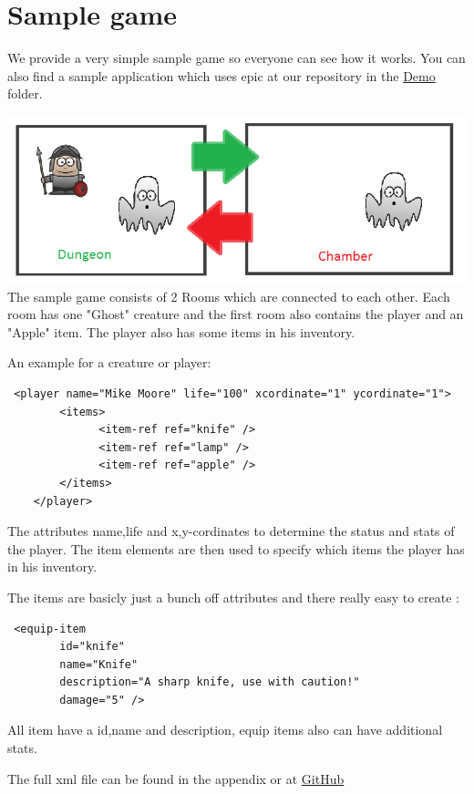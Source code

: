 \chapter{Sample game}

We provide a very simple sample game so everyone can see how it works.  You can also find a sample application which uses epic at our repository in the \href{https://github.com/kerko/epic/blob/dev/project/demo}{Demo} folder.

\includegraphics[scale=0.75]{assets/SampleGame.png}
 The sample game consists of 2 Rooms which are connected to each other. Each room has one "Ghost" creature and the first room also contains the player and an "Apple" item.  The player also has some items in his inventory.
 
 An example for a creature or player:
 \begin{verbatim}
 <player name="Mike Moore" life="100" xcordinate="1" ycordinate="1">
        <items>
              <item-ref ref="knife" />
              <item-ref ref="lamp" />
              <item-ref ref="apple" />
        </items>
    </player>
 \end{verbatim}
 The  attributes name,life and x,y-cordinates to determine the status and stats of the player.
 The item elements are then used to specify which items the player has in his inventory.
 
 The items are basicly just a bunch off attributes and there really easy to create :
 \begin{verbatim}
 <equip-item
        id="knife"
        name="Knife"
        description="A sharp knife, use with caution!"
        damage="5" />
 \end{verbatim}
All item have a id,name and description, equip items also can have additional stats.

The full xml file can be found in the appendix or at \href{https://github.com/kerko/epic/blob/dev/project/demo/demo.xml}{GitHub}